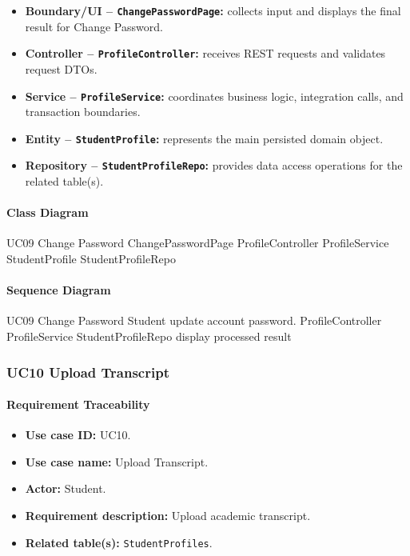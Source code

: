\begin{itemize}
    \item \textbf{Boundary/UI -- \texttt{ChangePasswordPage}:} collects input and displays the final result for Change Password.
    \item \textbf{Controller -- \texttt{ProfileController}:} receives REST requests and validates request DTOs.
    \item \textbf{Service -- \texttt{ProfileService}:} coordinates business logic, integration calls, and transaction boundaries.
    \item \textbf{Entity -- \texttt{StudentProfile}:} represents the main persisted domain object.
    \item \textbf{Repository -- \texttt{StudentProfileRepo}:} provides data access operations for the related table(s).
\end{itemize}

\paragraph{Class Diagram}

\ClassDiagram
{UC09 Change Password}
{ChangePasswordPage}
{ProfileController}
{ProfileService}
{StudentProfile}
{StudentProfileRepo}

\paragraph{Sequence Diagram}

\SequenceDiagram
{UC09 Change Password}
{Student}
{update account password.}
{ProfileController}
{ProfileService}
{StudentProfileRepo}
{display processed result}

\subsubsection{UC10 Upload Transcript}

\paragraph{Requirement Traceability}

\begin{itemize}
    \item \textbf{Use case ID:} UC10.
    \item \textbf{Use case name:} Upload Transcript.
    \item \textbf{Actor:} Student.
    \item \textbf{Requirement description:} Upload academic transcript.
    \item \textbf{Related table(s):} \texttt{StudentProfiles}.
\end{itemize}

